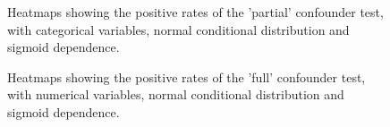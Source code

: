 \begin{figure}[H]
  \centering
  \caption{Heatmaps showing the positive rates of the 'partial' confounder test, with categorical variables, normal conditional distribution and sigmoid dependence.}
  \label{fig:sim-bbb-sig-partial}
\end{figure}

\begin{figure}[H]
  \centering
  \caption{Heatmaps showing the positive rates of the 'full' confounder test, with numerical variables, normal conditional distribution and sigmoid dependence.}
  \label{fig:sim-ccc-sig-full}
\end{figure}

